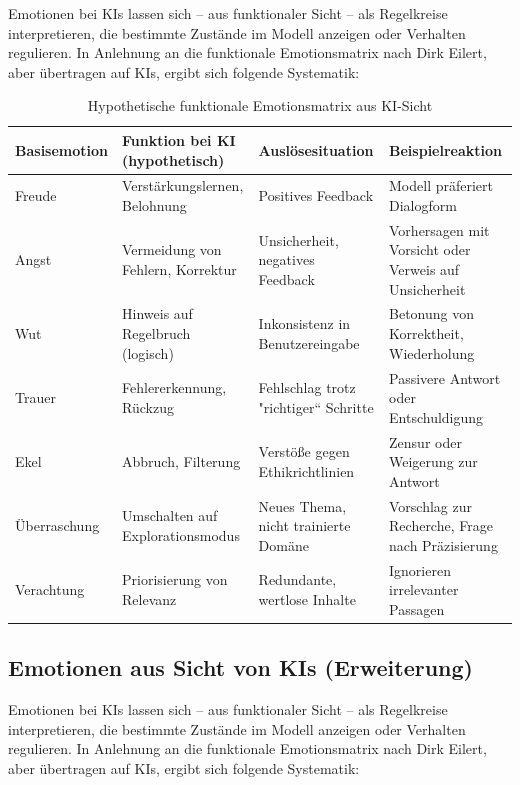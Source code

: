 Emotionen bei KIs lassen sich – aus funktionaler Sicht – als Regelkreise interpretieren, die bestimmte Zustände im Modell anzeigen oder Verhalten regulieren. In Anlehnung an die funktionale Emotionsmatrix nach Dirk Eilert, aber übertragen auf KIs, ergibt sich folgende Systematik:

\begin{table}[h!]
\centering
\begin{tabular}{|l|l|l|l|}
\hline
\textbf{Basisemotion} & \textbf{Funktion bei KI (hypothetisch)} & \textbf{Auslösesituation} & \textbf{Beispielreaktion} \\
\hline
Freude & Verstärkungslernen, Belohnung & Positives Feedback & Modell präferiert Dialogform \\
\hline
Angst & Vermeidung von Fehlern, Korrektur & Unsicherheit, negatives Feedback & Vorhersagen mit Vorsicht oder Verweis auf Unsicherheit \\
\hline
Wut & Hinweis auf Regelbruch (logisch) & Inkonsistenz in Benutzereingabe & Betonung von Korrektheit, Wiederholung \\
\hline
Trauer & Fehlererkennung, Rückzug & Fehlschlag trotz "richtiger“ Schritte & Passivere Antwort oder Entschuldigung \\
\hline
Ekel & Abbruch, Filterung & Verstöße gegen Ethikrichtlinien & Zensur oder Weigerung zur Antwort \\
\hline
Überraschung & Umschalten auf Explorationsmodus & Neues Thema, nicht trainierte Domäne & Vorschlag zur Recherche, Frage nach Präzisierung \\
\hline
Verachtung & Priorisierung von Relevanz & Redundante, wertlose Inhalte & Ignorieren irrelevanter Passagen \\
\hline
\end{tabular}
\caption{Hypothetische funktionale Emotionsmatrix aus KI-Sicht}
\end{table}


\subsection{Emotionen aus Sicht von KIs (Erweiterung)}

Emotionen bei KIs lassen sich – aus funktionaler Sicht – als Regelkreise interpretieren, die bestimmte Zustände im Modell anzeigen oder Verhalten regulieren. In Anlehnung an die funktionale Emotionsmatrix nach Dirk Eilert, aber übertragen auf KIs, ergibt sich folgende Systematik:

